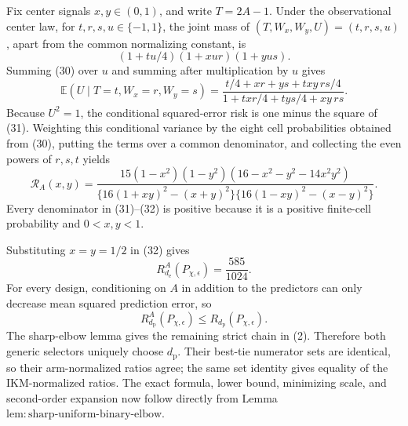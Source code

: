 Fix center signals \(x,y\in(0,1)\), and write \(T=2A-1\).  Under the observational center law, for \(t,r,s,u\in\{-1,1\}\), the joint mass of \((T,W_x,W_y,U)=(t,r,s,u)\), apart from the common normalizing constant, is
\[
 (1+tu/4)(1+xur)(1+yus).                                  \tag{30}
\]
Summing (30) over \(u\) and summing after multiplication by \(u\) gives
\[
 \mathbb E(U\mid T=t,W_x=r,W_y=s)
 =\frac{t/4+xr+ys+txy\,rs/4}
 {1+txr/4+tys/4+xy\,rs}.                                  \tag{31}
\]
Because \(U^2=1\), the conditional squared-error risk is one minus the square of (31).  Weighting this conditional variance by the eight cell probabilities obtained from (30), putting the terms over a common denominator, and collecting the even powers of \(r,s,t\) yields
\[
 \mathcal R_A(x,y)=
 \frac{15(1-x^2)(1-y^2)(16-x^2-y^2-14x^2y^2)}
 {\{16(1+xy)^2-(x+y)^2\}\{16(1-xy)^2-(x-y)^2\}}.         \tag{32}
\]
Every denominator in (31)--(32) is positive because it is a positive finite-cell probability and \(0<x,y<1\).

Substituting \(x=y=1/2\) in (32) gives
\[
 R_{d_{\mathrm e}}^A(P_{\chi,\epsilon})=\frac{585}{1024}.
\]
For every design, conditioning on \(A\) in addition to the predictors can only decrease mean squared prediction error, so
\[
 R_{d_{\mathrm p}}^A(P_{\chi,\epsilon})
 \le R_{d_{\mathrm p}}(P_{\chi,\epsilon}).                \tag{33}
\]
The sharp-elbow lemma gives the remaining strict chain in (2).  Therefore both generic selectors uniquely choose \(d_{\mathrm p}\).  Their best-tie numerator sets are identical, so their arm-normalized ratios agree; the same set identity gives equality of the IKM-normalized ratios.  The exact formula, lower bound, minimizing scale, and second-order expansion now follow directly from Lemma~\(\mathrm{lem{:}sharp\text{-}uniform\text{-}binary\text{-}elbow}\).